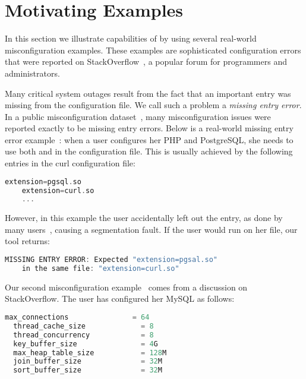 \section{Motivating Examples}
\label{sec:motiv}

In this section we illustrate capabilities of \app by 
using several real-world misconfiguration examples. 
These examples are sophisticated configuration errors
that were reported on StackOverflow~\cite{stackoverflow},
a popular forum for programmers and administrators. 

Many critical system outages result from the fact that an important
entry was missing from the configuration file. 
We call such a problem a {\em missing entry error}.
In a public misconfiguration 
dataset~\cite{configdataset}, many misconfiguration issues were 
reported exactly to be missing entry errors.
Below is a real-world missing entry error example~\cite{missingentry}:
when a user configures her PHP and PostgreSQL,
she needs to use both  and 
in the  configuration file.
This is usually
achieved by the following entries in 
the curl configuration file:

\begin{lstlisting}[language=C, xleftmargin=.01\textwidth]
    extension=pgsql.so
    extension=curl.so
    ...
\end{lstlisting} 

However, in this example the user accidentally
left out the  entry, 
as done by many users~\cite{yin11anempirical, missingentry}, 
causing a segmentation fault. 
If the user would run \app on her file,
our tool returns:

\begin{lstlisting}[language=C, xleftmargin=.01\textwidth]
    MISSING ENTRY ERROR: Expected "extension=pgsal.so"
    in the same file: "extension=curl.so"
\end{lstlisting} 

\label{ex:fine}
Our second misconfiguration example~\cite{correlation} 
comes from a discussion on StackOverflow.
The user has configured her MySQL as follows:

\begin{lstlisting}[language=C, xleftmargin=.01\textwidth]
  max_connections               = 64
  thread_cache_size             = 8
  thread_concurrency            = 8
  key_buffer_size               = 4G
  max_heap_table_size           = 128M
  join_buffer_size              = 32M
  sort_buffer_size              = 32M    
\end{lstlisting} 

